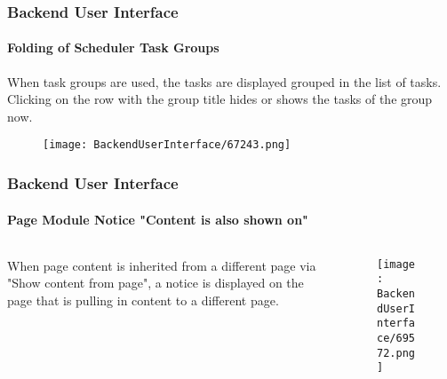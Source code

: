 \begin{frame}[fragile]
	\frametitle{Backend User Interface}
	\framesubtitle{Folding of Scheduler Task Groups}

	When task groups are used, the tasks are displayed grouped in the list of tasks.
	Clicking on the row with the group title hides or shows the tasks of the group now.

	\begin{figure}\vspace{-0.3cm}
		\texttt{[image: BackendUserInterface/67243.png]}
	\end{figure}

\end{frame}

\begin{frame}[fragile]
	\frametitle{Backend User Interface}
	\framesubtitle{Page Module Notice "Content is also shown on"}

	\begin{columns}[T]
		\begin{column}{.3\textwidth}
			When page content is inherited from a different page via "Show content from page",
			a notice is displayed on the page that is pulling in content to a different page.
		\end{column}

		\begin{column}{.7\textwidth}
			\begin{figure}\vspace*{-0.6cm}
				\texttt{[image: BackendUserInterface/69572.png]}
			\end{figure}
		\end{column}
	\end{columns}

\end{frame}

